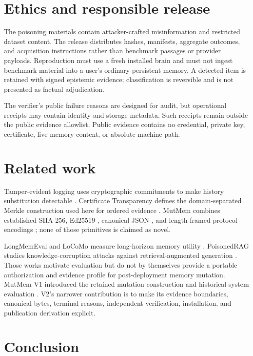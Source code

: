 \documentclass[10pt]{article}
\begin{document}
\section{Ethics and responsible release}

The poisoning materials contain attacker-crafted misinformation and restricted
dataset content. The release distributes hashes, manifests, aggregate outcomes,
and acquisition instructions rather than benchmark passages or provider
payloads. Reproduction must use a fresh installed brain and must not ingest
benchmark material into a user's ordinary persistent memory. A detected item is
retained with signed epistemic evidence; classification is reversible and is
not presented as factual adjudication.

The verifier's public failure reasons are designed for audit, but operational
receipts may contain identity and storage metadata. Such receipts remain outside
the public evidence allowlist. Public evidence contains no credential, private
key, certificate, live memory content, or absolute machine path.

\section{Related work}

Tamper-evident logging uses cryptographic commitments to make history
substitution detectable \cite{crosbywallach}. Certificate Transparency defines
the domain-separated Merkle construction used here for ordered evidence
\cite{rfc6962}. MutMem combines established SHA-256, Ed25519 \cite{rfc8032},
canonical JSON \cite{rfc8785}, and length-framed protocol encodings
\cite{bonehshoup}; none of those primitives is claimed as novel.

LongMemEval and LoCoMo measure long-horizon memory utility
\cite{longmemeval,locomo}. PoisonedRAG studies knowledge-corruption attacks
against retrieval-augmented generation \cite{poisonedrag}. Those works motivate
evaluation but do not by themselves provide a portable authorization and
evidence profile for post-deployment memory mutation. MutMem V1 introduced the
retained mutation construction and historical system evaluation
\cite{mutmemv1}. V2's narrower contribution is to make its evidence boundaries,
canonical bytes, terminal reasons, independent verification, installation, and
publication derivation explicit.

\section{Conclusion}
\end{document}
